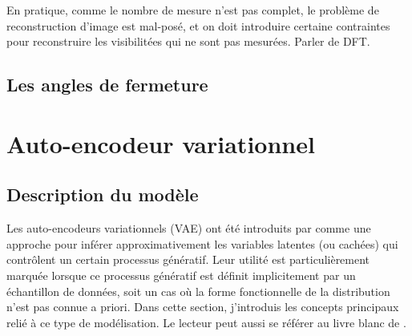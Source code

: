 En pratique, comme le nombre de mesure n'est pas complet, le problème de reconstruction d'image 
est mal-posé, et on doit introduire certaine contraintes pour reconstruire les visibilitées qui ne sont 
pas mesurées. Parler de DFT. 





\subsection{Les angles de fermeture}

\section{Auto-encodeur variationnel}
 
\subsection{Description du modèle}

Les auto-encodeurs variationnels (VAE) ont été introduits par \citet{Kingma2013} comme une approche 
pour inférer approximativement les variables latentes (ou cachées) qui contrôlent un certain processus génératif. 
Leur utilité est particulièrement marquée lorsque ce processus génératif est définit implicitement par un échantillon de données, 
soit un cas où la forme fonctionnelle de la distribution n'est pas connue a priori.
Dans cette section, j'introduis 
les concepts principaux relié à ce type de modélisation. 
Le lecteur peut aussi se référer au livre blanc de \citet{Kingma2019}.

